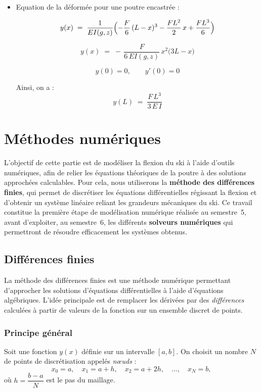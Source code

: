 \documentclass[12pt, a4paper]{article}
\begin{document}
\begin{itemize}
\begin{itemize}
    \[
\dv{T_{y}(x)}{x} =-q(x)
\]
où $q(x)$ est \textbf{la charge répartie}
\end{itemize}

\item Equation de la déformée pour une poutre encastrée :

\[
y(x) \;=\; \frac{1}{E I(g,z)}
\Bigl(
-\frac{F}{6}\,(L-x)^{3}
-\frac{F L^{2}}{2}\,x
+\frac{F L^{3}}{6}
\Bigr)
\]

\[
y(x) \;=\; -\,\frac{F}{6\,E I(g,z)}\,x^{2}\bigl(3L - x\bigr)
\]

\[
y(0)=0, \qquad y'(0)=0
\]

Ainsi, on a :
  \[
y(L) \;=\; \frac{F\,L^{3}}{3\,E\,I}
\]
\end{itemize}

\section{\textbf{Méthodes numériques}}

L’objectif de cette partie est de modéliser la flexion du ski à l’aide d’outils numériques, afin de relier les équations théoriques de la poutre à des solutions approchées calculables.  
Pour cela, nous utiliserons la \textbf{méthode des différences finies}, qui permet de discrétiser les équations différentielles régissant la flexion et d’obtenir un système linéaire reliant les grandeurs mécaniques du ski.  
Ce travail constitue la première étape de modélisation numérique réalisée au semestre~5, avant d’exploiter, au semestre~6, les différents \textbf{solveurs numériques} qui permettront de résoudre efficacement les systèmes obtenus.

\subsection{Différences finies}

La méthode des différences finies est une méthode numérique permettant d'approcher
les solutions d'équations différentielles à l'aide d'équations algébriques.
L'idée principale est de remplacer les dérivées par des \textit{différences}
calculées à partir de valeurs de la fonction sur un ensemble discret de points.

\subsubsection{Principe général}

Soit une fonction $y(x)$ définie sur un intervalle $[a,b]$.
On choisit un nombre $N$ de points de discrétisation appelés \textit{nœuds} :
\[
x_0 = a,\quad x_1 = a + h,\quad x_2 = a + 2h,\quad \dots,\quad x_N = b,
\]
où $h = \dfrac{b - a}{N}$ est le pas du maillage.
\end{document}

